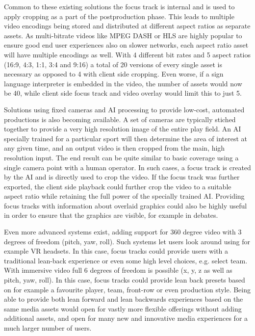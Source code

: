 \documentclass[sigconf, review=true]{acmart}
\begin{document}
Common to these existing solutions the focus track is internal and is used to
apply cropping as a part of the postproduction phase. This leads to multiple
video encodings being stored and distributed at different aspect ratios as
separate assets. As multi-bitrate videos like MPEG DASH or HLS are highly
popular to ensure good end user experiences also on slower networks, each
aspect ratio asset will have multiple encodings as well. With 4 different bit
rates and 5 aspect ratios (16:9, 4:3, 1:1, 3:4 and 9:16) a total of 20
versions of every single asset is necessary as opposed to 4 with client side
cropping. Even worse, if a sign language interpreter is embedded in the
video, the number of assets would now be 40, while client side focus track
and video overlay would limit this to just 5.

Solutions using fixed cameras and AI processing to provide low-cost, automated
productions is also becoming available\cite{ai_sports}. A set of cameras are
typically stiched together to provide a very high resolution image of the
entire play field. An AI specially trained for a particular sport will then
determine the area of interest at any given time, and an output video is then
cropped from the main, high resolution input. The end result can be quite
similar to basic coverage using a single camera point with a human operator.
In such cases, a focus track is created by the AI and is directly used to
crop the video. If the focus track was further exported, the client side
playback could further crop the video to a suitable aspect ratio while
retaining the full power of the specially trained AI. Providing focus tracks
with information about overlaid graphics could also be highly useful in order
to ensure that the graphics are visible, for example in debates.

Even more advanced systems exist, adding support for 360 degree video with 3
degrees of freedom (pitch, yaw, roll)\cite{8712670}. Such systems let users
look around using for example VR headsets. In this case, focus tracks could
provide users with a traditional lean-back experience or even some high level
choices, e.g. select team. With immersive video\cite
{yeung2020delivering} full 6 degrees of freedom is possible (x, y, z as well
as pitch, yaw, roll). In this case, focus tracks could provide lean back
presets based on for example a favourite player, team, front-row or even
production style. Being able to provide both lean forward and lean backwards
experiences based on the same media assets would open for vastly more
flexible offerings without adding additional assets, and open for many new
and innovative media experiences for a much larger number of users. 
\end{document}
